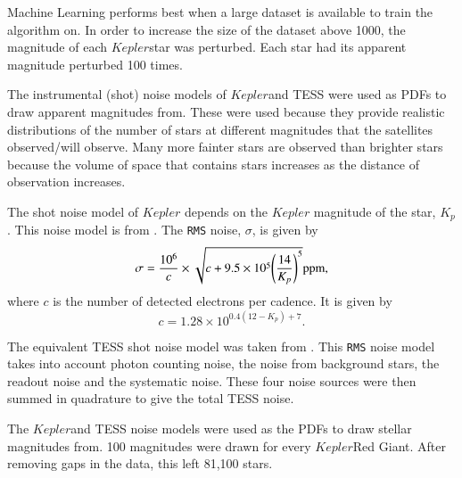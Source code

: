 \documentclass[a4paper,fleqn,usenatbib,useAMS]{mnras}
\newcommand{\kep}{\ensuremath{Kepler}\:}
\begin{document}
Machine Learning performs best when a large dataset is available to train the algorithm on. In order to increase the size of the dataset above 1000, the magnitude of each \kep star was perturbed. Each star had its apparent magnitude perturbed 100 times. 

The instrumental (shot) noise models of \kep and TESS were used as PDFs to draw apparent magnitudes from. These were used because they provide realistic distributions of the number of stars at different magnitudes that the satellites observed/will observe. Many more fainter stars are observed than brighter stars because the volume of space that contains stars increases as the distance of observation increases.

The shot noise model of $Kepler$ depends on the $Kepler$ magnitude of the star, $K_{p}$. This noise model is from \citet{gilliland_initial_2010}. The \texttt{RMS} noise, $\sigma$, is given by
\begin{equation}
\sigma = \frac{10^{6}}{c} \times \sqrt{c+9.5 \times 10^{5}\Bigg(\frac{14}{K_{p}}\Bigg)^{5}}  {\rm ppm},
\label{eq:kep noise}
\end{equation}
where $c$ is the number of detected electrons per cadence. It is given by
\begin{equation}
c = 1.28 \times 10^{0.4(12-K_{p})+7} .
\end{equation}

The equivalent TESS shot noise model was taken from \citet{sullivan_transiting_2015}. This \texttt{RMS} noise model takes into account photon counting noise, the noise from background stars, the readout noise and the systematic noise. These four noise sources were then summed in quadrature to give the total TESS noise.

The \kep and TESS noise models were used as the PDFs to draw stellar magnitudes from. 100 magnitudes were drawn for every \kep Red Giant. After removing gaps in the data, this left 81,100 stars.
\end{document}
